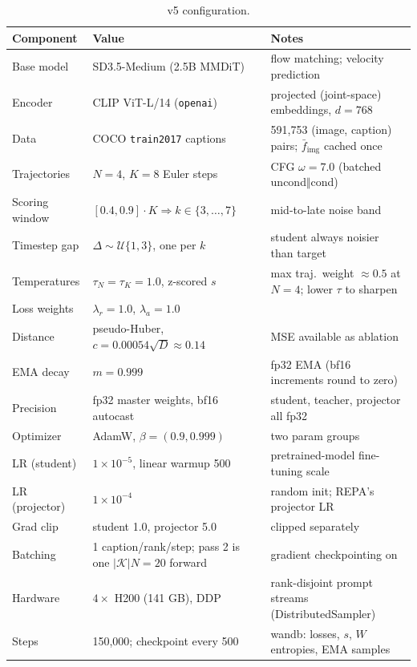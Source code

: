\documentclass[10pt]{article}
\newcommand{\fimg}{\bar{f}_{\mathrm{img}}}
\begin{document}
\begin{table}[h]
\centering
\small
\begin{tabular}{@{}llp{7.2cm}@{}}
\toprule
\textbf{Component} & \textbf{Value} & \textbf{Notes} \\
\midrule
Base model & SD3.5-Medium (2.5B MMDiT) & flow matching; velocity prediction \\
Encoder & CLIP ViT-L/14 (\texttt{openai}) & projected (joint-space) embeddings, $d = 768$ \\
Data & COCO \texttt{train2017} captions & 591{,}753 (image, caption) pairs; $\fimg$ cached once \\
Trajectories & $N = 4$, $K = 8$ Euler steps & CFG $\omega = 7.0$ (batched uncond$\Vert$cond) \\
Scoring window & $[0.4, 0.9] \cdot K \Rightarrow k \in \{3, \dots, 7\}$ & mid-to-late noise band \\
Timestep gap & $\Delta \sim \mathcal{U}\{1, 3\}$, one per $k$ & student always noisier than target \\
Temperatures & $\tau_N = \tau_K = 1.0$, z-scored $s$ & max traj.\ weight ${\approx}0.5$ at $N{=}4$; lower $\tau$ to sharpen \\
Loss weights & $\lambda_r = 1.0$, $\lambda_a = 1.0$ & \\
Distance & pseudo-Huber, $c = 0.00054\sqrt{D} \approx 0.14$ & MSE available as ablation \\
EMA decay & $m = 0.999$ & fp32 EMA (bf16 increments round to zero) \\
Precision & fp32 master weights, bf16 autocast & student, teacher, projector all fp32 \\
Optimizer & AdamW, $\beta = (0.9, 0.999)$ & two param groups \\
LR (student) & $1 \times 10^{-5}$, linear warmup 500 & pretrained-model fine-tuning scale \\
LR (projector) & $1 \times 10^{-4}$ & random init; REPA's projector LR \\
Grad clip & student 1.0, projector 5.0 & clipped separately \\
Batching & 1 caption/rank/step; pass 2 is one $|\mathcal{K}| N{=}20$ forward & gradient checkpointing on \\
Hardware & $4 \times$ H200 (141 GB), DDP & rank-disjoint prompt streams (DistributedSampler) \\
Steps & 150{,}000; checkpoint every 500 & wandb: losses, $s$, $W$ entropies, EMA samples \\
\bottomrule
\end{tabular}
\caption{v5 configuration.}
\end{table}
\end{document}
